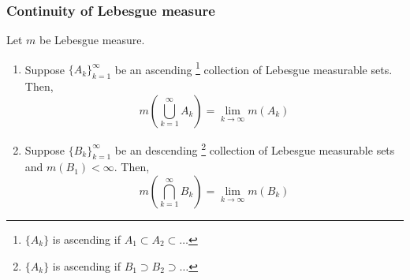 \subsubsection{Continuity of Lebesgue measure}
\begin{theorem}[continuity]
	Let $m$ be Lebesgue measure.
\begin{enumerate}
	\item
	Suppose $\{ A_k \}_{k=1}^\infty$ be an ascending
	\footnote{$\{A_k\}$ is ascending if $A_1 \subset A_2 \subset \dots$}
	collection of Lebesgue measurable sets.
	Then, 
	\begin{equation}
		m \left( \bigcup_{k=1}^\infty A_k \right) = \lim_{k \to \infty} m(A_k)
	\end{equation}
	\item
	Suppose $\{ B_k \}_{k=1}^\infty$ be an descending
	\footnote{$\{A_k\}$ is ascending if $B_1 \supset B_2 \supset \dots$}
	collection of Lebesgue measurable sets and $m(B_1) < \infty$.
	Then, 
	\begin{equation}
		m \left( \bigcap_{k=1}^\infty B_k \right) = \lim_{k \to \infty} m(B_k)
	\end{equation}
	\end{enumerate}
	\label{thm:continuityofmeasure}
\end{theorem}
